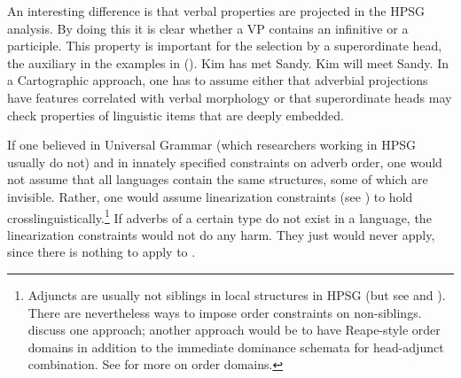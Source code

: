 \documentclass[output=paper
                ,modfonts
                ,nonflat
	        ,collection
	        ,collectionchapter
	        ,collectiontoclongg
 	        ,biblatex
                ,babelshorthands
                ,newtxmath
                ,draftmode
                ,colorlinks, citecolor=brown
]{./langsci/langscibook}
\begin{document}
An interesting difference is that verbal properties are projected in the HPSG analysis. By doing
this it is clear whether a VP contains an infinitive or a participle.
This property is important for the selection by a superordinate head, \eg the auxiliary in the examples
in (). 
\eal
\ex Kim has met Sandy.
\ex Kim will meet Sandy.
\zl
In a Cartographic approach, one has to assume either that adverbial projections have
features correlated with verbal morphology or that superordinate heads may check
properties of linguistic items that are deeply embedded.

If one believed in Universal Grammar (which researchers working
in HPSG usually do not) and in innately specified constraints on adverb order, one would not assume
that all languages contain the same structures, some of which are
invisible. Rather, one would assume linearization constraints (see
) to hold crosslinguistically.\footnote{%
  Adjuncts are usually not siblings in local structures in HPSG (but see \citealt{Kasper94a} and
  \citealt[, 71]{BvN98a}). There are nevertheless ways to
  impose order constraints on non-siblings. \citet*{EEU92a} discuss one approach; another approach
  would be to have Reape-style order domains \citep{Reape94a} in addition to the immediate dominance
  schemata for head-adjunct combination. See  for more on order domains.
} If adverbs
of a certain type do not exist in a language, the linearization constraints would not do any
harm. They just would never apply, since there is nothing to apply to \citep[]{MuellerCoreGram}.
\end{document}

